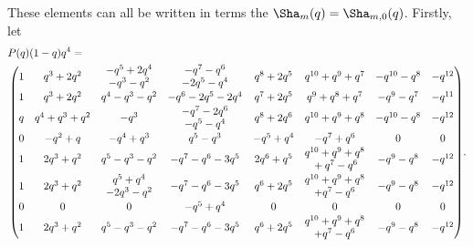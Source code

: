 \documentclass[pdftex]{sigma}
\numberwithin{equation}{section}
\def\WRT{\Sha}
\begin{document}
These elements can all be written in terms the $\WRT_{m}(q)=\WRT_{m,0}(q)$. Firstly, let{\setlength{\arraycolsep}{2.5pt}
\begin{align}
&P(q)(1-q)q^4 =\label{eq:can.basis.P}\\
&\begin{pmatrix}
1 & q^3 + 2q^2 & \begin{array}{@{}c@{}} -q^5 + 2q^4 \\  - q^3 - q^2\end{array} & \begin{array}{@{}c@{}} -q^7 - q^6 \\   - 2q^5 - q^4\end{array} & q^8 + 2q^5 & q^{10} + q^9 + q^7 & -q^{10} - q^8 & -q^{12}\vspace{0.5mm}\\
1 & q^3 + 2q^2 & q^4 - q^3 - q^2 & -q^6 - 2q^5 - 2q^4 & q^7 + 2q^5 & q^9 + q^8 + q^7 & -q^9 - q^7 & -q^{11}\vspace{0.5mm}\\
q & q^4 + q^3 + q^2 & -q^3 & \begin{array}{@{}c@{}} -q^7 - 2q^6 \\  - q^5 - q^4\end{array} & q^8 + 2q^6 & q^{10} + q^9 + q^8 & -q^{10} - q^8 & -q^{12}\vspace{0.5mm}\\
0 & -q^2 + q & -q^4 + q^3 & q^5 - q^3 & -q^5 + q^4 & -q^7 + q^6 & 0 & 0\vspace{0.5mm}\\
1 & 2q^3 + q^2 & q^5 - q^3 - q^2 & -q^7 - q^6 - 3q^5 & 2q^6 + q^5 & \begin{array}{@{}c@{}} q^{10} + q^9 + q^8 \\ {}+ q^7 - q^6\end{array} & -q^9 - q^8 & -q^{12}\vspace{0.5mm}\\
1 & 2q^3 + q^2 & \begin{array}{@{}c@{}} q^5 + q^4\\   - 2q^3 - q^2\end{array} & -q^7 - q^6 - 3q^5 & q^6 + 2q^5 & \begin{array}{@{}c@{}}q^{10} + q^9 + q^8 \\  + q^7 - q^6\end{array} & -q^9 - q^8 & -q^{12}\vspace{0.5mm}\\
0 & 0 & 0 & -q^5 + q^4 & 0 & 0 & 0 & 0\vspace{0.5mm}\\
1 & 2q^3 + q^2 & q^5 - q^3 - q^2 & -q^7 - q^6 - 3q^5 & q^6 + 2q^5 & \begin{array}{@{}c@{}} q^{10} + q^9 + q^8 \\  + q^7 - q^6\end{array} & -q^9 - q^8 & -q^{12}
\end{pmatrix}\!.\nonumber
\end{align}}%
\end{document}
